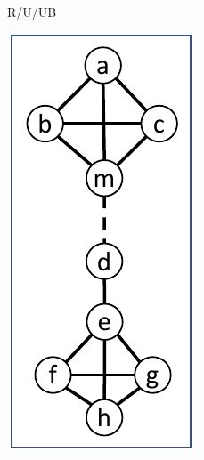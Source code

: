 \documentclass{article}
\begin{document}
\begin{figure}[t]
\begin{subfigure}{0.09\textwidth}
            \caption{R/U/UB}
            \label{fig:distance1_util_unsafe_remove_UB}
        \end{subfigure}
                \hfill
                \begin{subfigure}{0.09\textwidth}
            \centering
            \includegraphics[page=4,width=\textwidth]{Graphs/Distance_1_paper.pdf}

\end{subfigure}
\end{figure}
\end{document}
